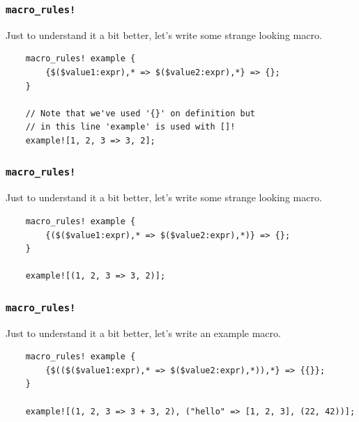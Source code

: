 \documentclass[aspectratio=1610,t]{beamer}
\begin{document}

\begin{frame}[fragile]
\frametitle{\texttt{macro\_rules!}}
Just to understand it a bit better, let's write some strange looking macro.

\begin{verbatim}
    macro_rules! example {
        {$($value1:expr),* => $($value2:expr),*} => {};
    }

    // Note that we've used '{}' on definition but
    // in this line 'example' is used with []!
    example![1, 2, 3 => 3, 2];
\end{verbatim}
\end{frame}


\begin{frame}[fragile]
\frametitle{\texttt{macro\_rules!}}
Just to understand it a bit better, let's write some strange looking macro.

\begin{verbatim}
    macro_rules! example {
        {($($value1:expr),* => $($value2:expr),*)} => {};
    }

    example![(1, 2, 3 => 3, 2)];
\end{verbatim}
\end{frame}


\begin{frame}[fragile]
\frametitle{\texttt{macro\_rules!}}
Just to understand it a bit better, let's write an example macro.

\begin{verbatim}
    macro_rules! example {
        {$(($($value1:expr),* => $($value2:expr),*)),*} => {{}};
    }

    example![(1, 2, 3 => 3 + 3, 2), ("hello" => [1, 2, 3], (22, 42))];
\end{verbatim}
\end{frame}

\end{document}

